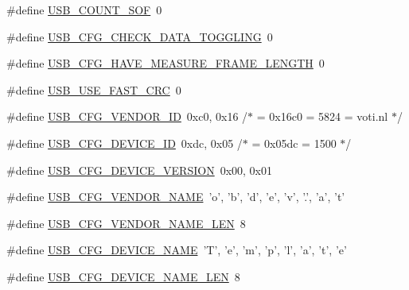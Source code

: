 \begin{DoxyCompactItemize}
\item 
\#define \hyperlink{mhvlib-_vusb-_keyboard_2vusb_2usbconfig-prototype_8h_a93e719c32f721d3e4b2dd5ba776da40b}{U\-S\-B\-\_\-\-C\-O\-U\-N\-T\-\_\-\-S\-O\-F}~0
\item 
\#define \hyperlink{mhvlib-_vusb-_keyboard_2vusb_2usbconfig-prototype_8h_a343f7b4bd7f8ba0348e106ef0f434215}{U\-S\-B\-\_\-\-C\-F\-G\-\_\-\-C\-H\-E\-C\-K\-\_\-\-D\-A\-T\-A\-\_\-\-T\-O\-G\-G\-L\-I\-N\-G}~0
\item 
\#define \hyperlink{mhvlib-_vusb-_keyboard_2vusb_2usbconfig-prototype_8h_a64864300fd8efb3c8d636b5c52f46fe7}{U\-S\-B\-\_\-\-C\-F\-G\-\_\-\-H\-A\-V\-E\-\_\-\-M\-E\-A\-S\-U\-R\-E\-\_\-\-F\-R\-A\-M\-E\-\_\-\-L\-E\-N\-G\-T\-H}~0
\item 
\#define \hyperlink{mhvlib-_vusb-_keyboard_2vusb_2usbconfig-prototype_8h_a056ce5afad0b0620c90bab5bd81e4166}{U\-S\-B\-\_\-\-U\-S\-E\-\_\-\-F\-A\-S\-T\-\_\-\-C\-R\-C}~0
\item 
\#define \hyperlink{mhvlib-_vusb-_keyboard_2vusb_2usbconfig-prototype_8h_a9326b8ec9f809ce66d54349691646930}{U\-S\-B\-\_\-\-C\-F\-G\-\_\-\-V\-E\-N\-D\-O\-R\-\_\-\-I\-D}~0xc0, 0x16 /$\ast$ = 0x16c0 = 5824 = voti.\-nl $\ast$/
\item 
\#define \hyperlink{mhvlib-_vusb-_keyboard_2vusb_2usbconfig-prototype_8h_abc740455309399430b0f49bf7931d1d7}{U\-S\-B\-\_\-\-C\-F\-G\-\_\-\-D\-E\-V\-I\-C\-E\-\_\-\-I\-D}~0xdc, 0x05 /$\ast$ = 0x05dc = 1500 $\ast$/
\item 
\#define \hyperlink{mhvlib-_vusb-_keyboard_2vusb_2usbconfig-prototype_8h_aba3c7c0cd4055ba3bbf5df38e57b6d27}{U\-S\-B\-\_\-\-C\-F\-G\-\_\-\-D\-E\-V\-I\-C\-E\-\_\-\-V\-E\-R\-S\-I\-O\-N}~0x00, 0x01
\item 
\#define \hyperlink{mhvlib-_vusb-_keyboard_2vusb_2usbconfig-prototype_8h_a25a2baf5c8feb0982a47050423add0ec}{U\-S\-B\-\_\-\-C\-F\-G\-\_\-\-V\-E\-N\-D\-O\-R\-\_\-\-N\-A\-M\-E}~'o', 'b', 'd', 'e', 'v', '.', 'a', 't'
\item 
\#define \hyperlink{mhvlib-_vusb-_keyboard_2vusb_2usbconfig-prototype_8h_a3085d820d9dc6e939737a3f1b9a457d7}{U\-S\-B\-\_\-\-C\-F\-G\-\_\-\-V\-E\-N\-D\-O\-R\-\_\-\-N\-A\-M\-E\-\_\-\-L\-E\-N}~8
\item 
\#define \hyperlink{mhvlib-_vusb-_keyboard_2vusb_2usbconfig-prototype_8h_a9b482a2b2740652ffe7dcb6695ca0c91}{U\-S\-B\-\_\-\-C\-F\-G\-\_\-\-D\-E\-V\-I\-C\-E\-\_\-\-N\-A\-M\-E}~'T', 'e', 'm', 'p', 'l', 'a', 't', 'e'
\item 
\#define \hyperlink{mhvlib-_vusb-_keyboard_2vusb_2usbconfig-prototype_8h_ae68f17e6baf13805abc56e74beadeb57}{U\-S\-B\-\_\-\-C\-F\-G\-\_\-\-D\-E\-V\-I\-C\-E\-\_\-\-N\-A\-M\-E\-\_\-\-L\-E\-N}~8

\end{DoxyCompactItemize}
